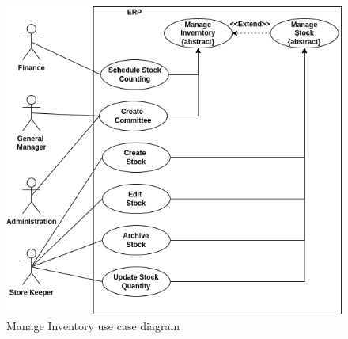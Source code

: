 \begin{figure}[!ht]
\centering
\includegraphics[width=15cm,keepaspectratio]{usecases/manage_inventory.drawio.png}
\caption{Manage Inventory use case diagram }
\end{figure}

